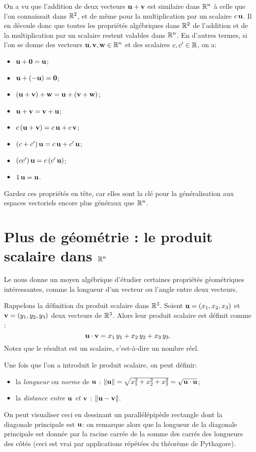On a vu que l'addition de deux vecteurs $\mathbf{u}+\mathbf{v}$ est similaire dans $\mathbb{R}^n$ à celle que l'on connaissait dans $\mathbb{R}^2$, et de même pour la multiplication par un scalaire $c\,\mathbf{u}$.
Il en découle donc que toutes les propriétés algébriques dans $\mathbb{R}^2$ de l'addition et de la multiplication par un scalaire restent valables dans $\mathbb{R}^n$.  En d'autres termes, si l'on se donne des vecteurs $\mathbf{u},\mathbf{v},\mathbf{w}\in\mathbb{R}^n$ et des scalaires $c,c' \in \mathbb{R}$, on a:
\begin{itemize}
\item $\mathbf{u}+\mathbf{0} = \mathbf{u}$;
\item $\mathbf{u} + (-\mathbf{u}) = \mathbf{0}$;
\item $(\mathbf{u} + \mathbf{v}) + \mathbf{w} = \mathbf{u} + (\mathbf{v}+\mathbf{w})$;

\item $\mathbf{u}+\mathbf{v} = \mathbf{v}+\mathbf{u}$;
\item $c\,(\mathbf{u}+\mathbf{v}) = c\,\mathbf{u} + c\,\mathbf{v}$;
\item $(c+c')\,\mathbf{u} = c\,\mathbf{u} + c'\,\mathbf{u}$;
\item $(cc')\,\mathbf{u} = c\,(c'\,\mathbf{u})$;
\item $1\,\mathbf{u} = \mathbf{u}$.
\end{itemize}
Gardez ces propriétés en tête, car elles sont la clé pour la généralisation
aux espaces vectoriels encore plus généraux que $\mathbb{R}^n$.

\section{Plus de géométrie : le produit scalaire dans  \texorpdfstring{$\mathbb{R}^n$}{Rn}}

Le  nous donne
un moyen algébrique d'étudier certaines propriétés géométriques intéressantes, comme
la longueur d'un vecteur ou l'angle entre deux vecteurs.

Rappelons la définition du produit scalaire dans $\mathbb{R}^3$.
Soient $\mathbf{u} = (x_1,x_2,x_3)$ et $\mathbf{v} = (y_1,y_2,y_3)$ deux vecteurs de
$\mathbb{R}^3$.  Alors leur produit scalaire est définit comme :
$$
\mathbf{u} \cdot \mathbf{v} = x_1\,y_1 + x_2\,y_2 + x_3\,y_3.
$$
Notez que le résultat est un scalaire, c'est-à-dire un nombre réel.

Une fois que l'on a introduit le produit scalaire, on peut définir:
\begin{itemize}
\item la \emph{longueur} ou \emph{norme} de $\mathbf{u}$ : $\Vert \mathbf{u} \Vert = \sqrt{x_1^2+x_2^2+ x_3^2} = \sqrt{\mathbf{u} \cdot \mathbf{u}}$;
\item la \emph{distance entre $\mathbf{u}$ et $\mathbf{v}$} : $\Vert \mathbf{u} - \mathbf{v} \Vert$.
\end{itemize}
On peut visualiser ceci en dessinant un parallélépipède rectangle dont la diagonale principale est $\mathbf{u}$:
on remarque alors que la longueur de la diagonale principale est donnée par la racine carrée
de la somme des carrés des longueurs des côtés (ceci est vrai par applications répétées du théorème de Pythagore).

